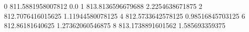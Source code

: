 0 811.5881958007812 0.0
1 813.8136596679688 2.2254638671875
2 812.7076416015625 1.11944580078125
4 812.5733642578125 0.98516845703125
6 812.86181640625 1.27362060546875
8 813.1738891601562 1.585693359375
